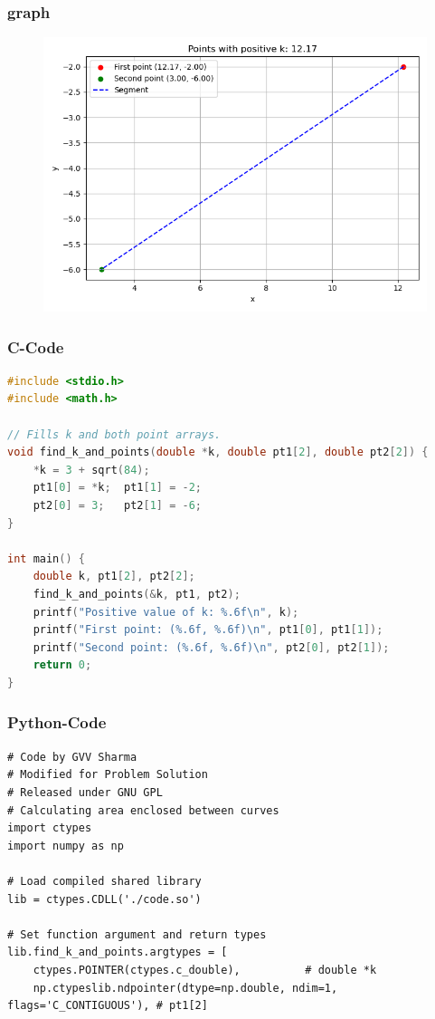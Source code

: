 \documentclass{beamer}
\begin{document}
\begin{frame}
\frametitle{graph}
\begin{figure}[!ht]
    \centering
    \includegraphics[width=\linewidth]{figs/points.png}
    \caption{}
\end{figure}
\end{frame}

\begin{frame}[fragile]
\frametitle{C-Code}
\begin{lstlisting}[language=C]
#include <stdio.h>
#include <math.h>

// Fills k and both point arrays.
void find_k_and_points(double *k, double pt1[2], double pt2[2]) {
    *k = 3 + sqrt(84);
    pt1[0] = *k;  pt1[1] = -2;
    pt2[0] = 3;   pt2[1] = -6;
}

int main() {
    double k, pt1[2], pt2[2];
    find_k_and_points(&k, pt1, pt2);
    printf("Positive value of k: %.6f\n", k);
    printf("First point: (%.6f, %.6f)\n", pt1[0], pt1[1]);
    printf("Second point: (%.6f, %.6f)\n", pt2[0], pt2[1]);
    return 0;
}

 \end{lstlisting}
\end{frame}

\begin{frame}[fragile]
\frametitle{Python-Code}
\begin{lstlisting}
# Code by GVV Sharma
# Modified for Problem Solution
# Released under GNU GPL
# Calculating area enclosed between curves
import ctypes
import numpy as np

# Load compiled shared library
lib = ctypes.CDLL('./code.so')

# Set function argument and return types
lib.find_k_and_points.argtypes = [
    ctypes.POINTER(ctypes.c_double),          # double *k
    np.ctypeslib.ndpointer(dtype=np.double, ndim=1, flags='C_CONTIGUOUS'), # pt1[2]

\end{lstlisting}
\end{frame}
\end{document}
